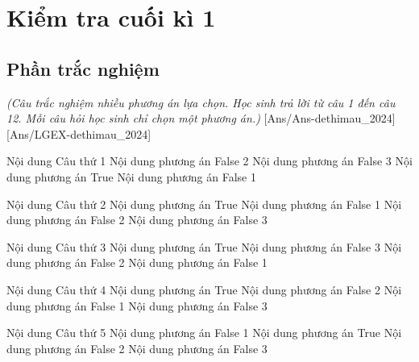 \documentclass[FileMain.tex]{subfiles}
\gdef\made{195}
\begin{document}
\section[Đề 20 Cấu trúc mới - Mã đề \made]{Kiểm tra cuối kì 1}
\subsection{Phần trắc nghiệm}
{\textit{(Câu trắc nghiệm nhiều phương án lựa chọn. Học sinh trả lời từ câu 1 đến câu 12. Mỗi câu hỏi học sinh chỉ chọn một phương án.)}}
[Ans/Ans-dethimau_2024]
\luuloigiaiex
{}[Ans/LGEX-dethimau_2024]
\begin{ex}
	Nội dung Câu thứ 1
	\choice
	{Nội dung phương án False 2}
	{Nội dung phương án False 3}
	{\True Nội dung phương án True}
	{Nội dung phương án False 1}
	\loigiai{}
\end{ex}
\begin{ex}
	Nội dung Câu thứ 2
	\choice
	{\True Nội dung phương án True}
	{Nội dung phương án False 1}
	{Nội dung phương án False 2}
	{Nội dung phương án False 3}
	\loigiai{}
\end{ex}
\begin{ex}
	Nội dung Câu thứ 3
	\choice
	{\True Nội dung phương án True}
	{Nội dung phương án False 3}
	{Nội dung phương án False 2}
	{Nội dung phương án False 1}
	\loigiai{}
\end{ex}
\begin{ex}
	Nội dung Câu thứ 4
	\choice
	{\True Nội dung phương án True}
	{Nội dung phương án False 2}
	{Nội dung phương án False 1}
	{Nội dung phương án False 3}
	\loigiai{}
\end{ex}
\begin{ex}
	Nội dung Câu thứ 5
	\choice
	{Nội dung phương án False 1}
	{\True Nội dung phương án True}
	{Nội dung phương án False 2}
	{Nội dung phương án False 3}
	\loigiai{}
\end{ex}
\end{document}
